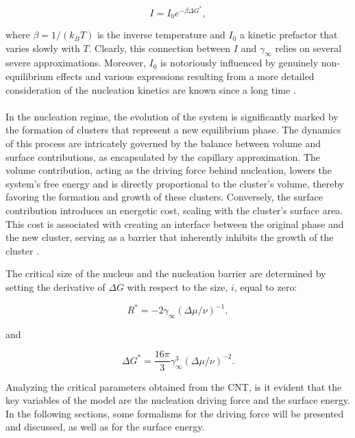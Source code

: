 \begin{equation}
    I = I_0 e^{-\beta \Delta G^\ast},
\end{equation}

where \(\beta = 1/(k_B T)\) is the inverse temperature and \(I_0\) a kinetic prefactor that varies slowly with \(T\). Clearly, this connection between \(I\) and \(\gamma_{\infty}\) relies 
on several severe approximations. Moreover, \(I_0\) is notoriously influenced by genuinely non-equilibrium effects and various expressions resulting from a more detailed consideration of the nucleation kinetics are known since a 
long time \cite{Hayashi1974}.

\paragraph{} In the nucleation regime, the evolution of the system is significantly marked by the formation of clusters that represent a new equilibrium phase. The dynamics of this process 
are intricately governed by the balance between volume and surface contributions, as encapsulated by the capillary approximation. The volume contribution, acting as the driving 
force behind nucleation, lowers the system's free energy and is directly proportional to the cluster's volume, thereby favoring the formation and growth of these clusters. Conversely, 
the surface contribution introduces an energetic cost, scaling with the cluster's surface area. This cost is associated with creating an interface between the original phase and the new 
cluster, serving as a barrier that inherently inhibits the growth of the cluster \cite{Clouet1}.

The critical size of the nucleus and the nucleation barrier are determined by setting the derivative of \(\Delta G\) with respect to the size, \(i\), equal to zero:

\begin{equation}
    R^* = -2\gamma_{\infty} (\Delta \mu / \nu)^{-1},
\end{equation}

and

\begin{equation}
    \Delta G^\ast = \frac{16 \pi}{3} \gamma_{\infty}^3(\Delta \mu / \nu)^{-2}.
\end{equation}

Analyzing the critical parameters obtained from the CNT, is it evident that the key variables of the model are the nucleation driving force and the surface energy. In the following sections,
some formalisms for the driving force will be presented and discussed, as well as for the surface energy. 
